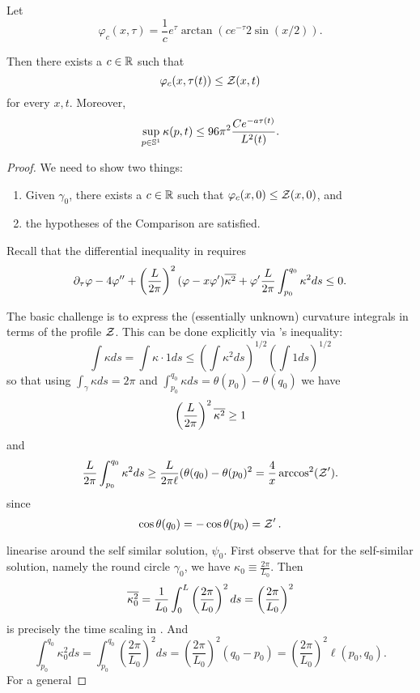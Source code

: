 \documentclass[a4paper, 12pt]{amsart}
\begin{document}
\begin{thm}
\label{thm:comparison_function}
Let
\[
\varphi_c(x, \tau) = \frac{1}{c} e^{\tau} \arctan(c e^{-\tau} 2\sin(x/2)).
\]

Then there exists a $c \in \R$ such that
\[
\varphi_c(x, \tau(t)) \leq \chordarcprofile(x, t)
\]
for every $x, t$. Moreover,
\[
\sup_{p \in \S^1} \kappa(p, t) \leq 96 \pi^2 \frac{Ce^{-a\tau(t)}}{L^2(t)}.
\]
\end{thm}

\begin{proof}
We need to show two things:
\begin{enumerate}
\item Given \(\gamma_0\), there exists a \(c \in \R\) such that \(\varphi_c(x, 0) \leq \chordarcprofile(x, 0)\), and
\item the hypotheses of the Comparison  are satisfied.
\end{enumerate}

Recall that the differential inequality in  requires
\[
\partial_{\tau} \varphi - 4 \varphi'' + \left(\frac{L}{2\pi}\right)^2 (\varphi - x \varphi') \avg{\kappa^2} + \varphi' \frac{L}{2\pi} \int_{p_0}^{q_0} \kappa^2 ds \leq 0.
\]

The basic challenge is to express the (essentially unknown) curvature integrals in terms of the profile \(\chordarcprofile\). This can be done explicitly via \holder{}'s inequality:
\[
\int \kappa ds = \int \kappa \cdot 1 ds \leq \left(\int \kappa^2 ds\right)^{1/2} \left(\int 1 ds\right)^{1/2}
\]
so that using \(\int_{\gamma} \kappa ds = 2\pi\) and \(\int_{p_0}^{q_0} \kappa ds = \theta(p_0) - \theta(q_0)\) we have
\[
\left(\frac{L}{2\pi}\right)^2 \avg{\kappa^2} \geq 1
\]
and
\[
\frac{L}{2\pi} \int_{p_0}^{q_0} \kappa^2 ds \geq \frac{L}{2\pi \ell} (\theta(q_0) - \theta(p_0)^2 = \frac{4}{x} \arccos^2(\chordarcprofile').
\]
since
\[
\cos \theta(q_0) = - \cos \theta(p_0) = \chordarcprofile'.
\]

linearise around the self similar solution, \(\psi_0\). First observe that for the self-similar solution, namely the round circle \(\gamma_0\), we have \(\kappa_0 \equiv \tfrac{2\pi}{L_0}\). Then
\[
\avg{\kappa_0^2} = \frac{1}{L_0}\int_0^L \left(\frac{2\pi}{L_0}\right)^2 ds = \left(\frac{2\pi}{L_0}\right)^2
\]
is precisely the time scaling in . And
\[
\int_{p_0}^{q_0} \kappa_0^2 ds = \int_{p_0}^{q_0} \left(\frac{2\pi}{L_0}\right)^2 ds = \left(\frac{2\pi}{L_0}\right)^2 (q_0 - p_0) = \left(\frac{2\pi}{L_0}\right)^2 \ell(p_0, q_0).
\]
For a general


\end{proof}
\end{document}
